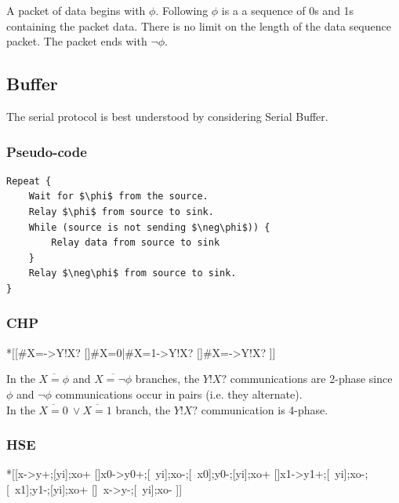 \documentclass{article}
\begin{document}
A packet of data begins with $\phi$.
Following $\phi$ is a a sequence of 0s and 1s containing the packet data.
There is no limit on the length of the data sequence packet.
The packet ends with $\neg\phi$. 

\subsection{Buffer}

\noindent
The serial protocol is best understood by considering Serial Buffer.

\subsubsection*{Pseudo-code}

\begin{lstlisting}[mathescape]
Repeat {
    Wait for $\phi$ from the source.
    Relay $\phi$ from source to sink.
    While (source is not sending $\neg\phi$)) {
        Relay data from source to sink
    }
    Relay $\neg\phi$ from source to sink.
}
\end{lstlisting}

\subsubsection*{CHP}

\begin{csp}
*[[#{X=\phi}->Y!X?
  []#{X=0}|#{X=1}->Y!X?
  []#{X=\neg\phi}->Y!X?
 ]]
\end{csp}

\noindent
In the $\overline{X=\phi}$ and $\overline{X=\neg\phi}$ branches,
the $Y!X?$ communications are 2-phase since $\phi$ and $\neg\phi$ 
communications occur in pairs (i.e. they alternate). \\
In the $\overline{X=0}\ \vee \overline{X=1}$ branch,
the $Y!X?$ communication is 4-phase.


\subsubsection*{HSE}

\begin{hse}
*[[x\phi->y\phi+;[yi];xo+
  []x0->y0+;[~yi];xo-;[~x0];y0-;[yi];xo+
  []x1->y1+;[~yi];xo-;[~x1];y1-;[yi];xo+
  []~x\phi->y\phi-;[~yi];xo-
 ]]
\end{hse}
\end{document}
